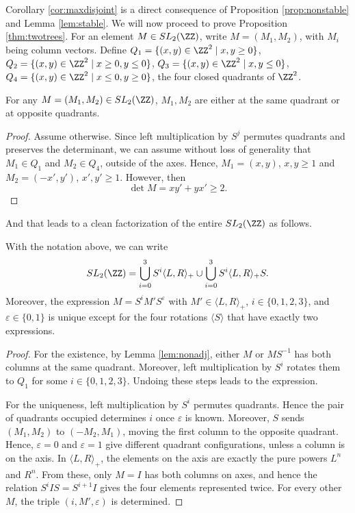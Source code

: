 \documentclass{article}
\begin{document}
	Corollary \ref{cor:maxdisjoint} is a direct consequence of Proposition \ref{prop:nonstable} and Lemma \ref{lem:stable}.	We will now proceed to prove Proposition \ref{thm:twotrees}. For an element $M\in SL_2(\ZZ)$, write $M=(M_1, M_2)$, with $M_i$ being column vectors. Define $Q_1=\{(x,y)\in \ZZ^2\mid x,y\geq0\}$, $Q_2=\{(x,y)\in \ZZ^2\mid x\geq0,y\leq0\}$, $Q_3=\{(x,y)\in \ZZ^2\mid x,y\leq0\}$, $Q_4=\{(x,y)\in \ZZ^2\mid x\leq0,y\geq0\}$, the four closed quadrants of $\ZZ^2$.
	
	\begin{lemma}\label{lem:nonadj}
		For any $M=(M_1,M_2)\in SL_2(\ZZ)$, $M_1,M_2$ are either at the same quadrant or at opposite quadrants. 
	\end{lemma}
	
	\begin{proof}
		Assume otherwise. Since left multiplication by $S^{j}$ permutes quadrants and preserves the determinant, we can assume without loss of generality that $M_1\in Q_1$ and $M_2\in Q_4$, outside of the axes. Hence, $M_1=(x,y)$, $x,y\geq 1$ and $M_2=(-x',y')$, $x',y'\geq1$. However, then 
		\[
		\det M=xy'+yx'\geq2.
		\]
	\end{proof}
	
	And that leads to a clean factorization of the entire $SL_2(\ZZ)$ as follows. 
	
	\begin{lemma}\label{lem:SLfact}With the notation above, we can write
		\[SL_2(\ZZ)= \bigcup_{i=0}^3 S^i\langle L,R\rangle_+\cup \bigcup_{i=0}^3  S^i\langle L,R\rangle_+ S. \]
		Moreover, the expression $M=S^i M' S^\varepsilon$ with $M'\in\langle L,R\rangle_+$, $i\in \{0,1,2,3\}$, and $\varepsilon\in\{0,1\}$ is unique except for the four rotations $\langle S \rangle$ that have exactly two expressions.
	\end{lemma}
	
	\begin{proof}
		For the existence, by Lemma \ref{lem:nonadj}, either $M$ or $M S^{-1}$ has both columns at the same quadrant. Moreover, left multiplication by $S^{i}$ rotates them to $Q_1$ for some $i\in \{0,1,2,3\}$. Undoing these steps leads to the expression.
		
		For the uniqueness, left multiplication by $S^i$  permutes quadrants. Hence the pair of quadrants occupied determines $i$ once $\varepsilon$ is known. Moreover, $S$ sends $(M_1,M_2)$ to $(-M_2,M_1)$, moving the first column to the opposite quadrant. Hence, $\varepsilon=0$ and $\varepsilon=1$ give different quadrant configurations, unless a column is on the axis. In $\langle L, R\rangle_+$, the elements on the axis are exactly the pure powers $L^n$ and $R^n$. From these, only $M=I$ has both columns on axes, and hence the relation $S^i I S=S^{i+1} I$ gives the four elements represented twice. For every other $M$, the triple $(i,M',\varepsilon)$ is determined.
	\end{proof}
	
\end{document}
